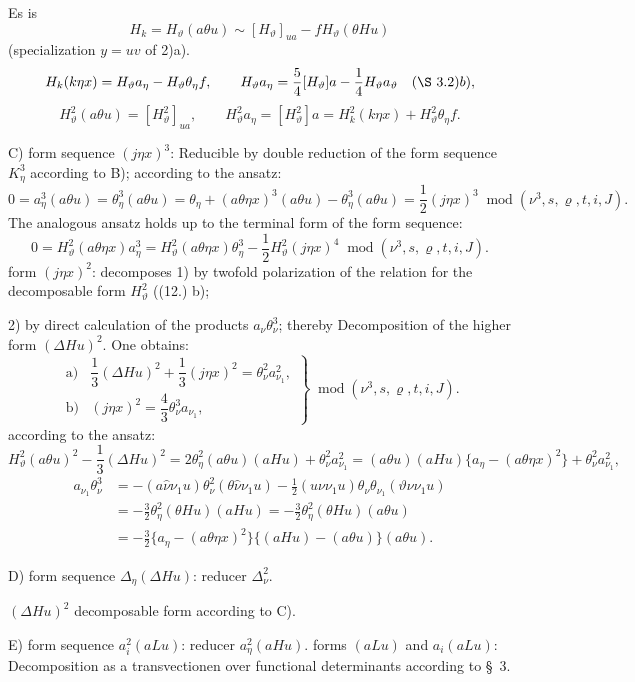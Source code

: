 \documentclass[11pt]{article}
\newcommand{\A}{\Delta}
\newcommand{\R}{\varrho}
\newcommand{\modu}[1]{\;\operatorname{mod} #1}
\providecommand{\modu}[1]{\;\operatorname{mod} #1}
\begin{document}
Es is
\[
H_k=H_\vartheta(a\theta u)\sim [H_\vartheta]_{ua}-fH_\vartheta(\theta Hu)
\]
(specialization $y=uv$ of 2)a).
\[
H_k(k\eta x)=H_\vartheta a_\eta-H_\vartheta\theta_\eta f,
\qquad
H_\vartheta a_\eta=\frac54[H_\vartheta]a-\frac14H_\vartheta a_\vartheta
\quad(\S\ 3. 2)b),
\]
\[
H_\vartheta^2(a\theta u)=[H_\vartheta^2]_{ua},
\qquad
H_\vartheta^2a_\eta=[H_\vartheta^2]a=H_k^2(k\eta x)+H_\vartheta^2\theta_\eta f.
\]

\noindent C) form sequence $(j\eta x)^3$: Reducible by double reduction of the form sequence $K_\eta^3$ according to B); according to the ansatz:
\[
0=a_\eta^3(a\theta u)=\theta_\eta^3(a\theta u)
=\theta_\eta+(a\theta\eta x)^3(a\theta u)-\theta_\eta^3(a\theta u)
=\frac12(j\eta x)^3\modu{(\nu^3,s,\R,t,i,J)}.
\]
The analogous ansatz holds up to the terminal form of the form sequence:
\[
0=H_\vartheta^2(a\theta\eta x)a_\eta^3
=H_\vartheta^2(a\theta\eta x)\theta_\eta^3
-\frac12H_\vartheta^2(j\eta x)^4\modu{(\nu^3,s,\R,t,i,J)}.
\]
form $(j\eta x)^2$: decomposes 1) by twofold polarization of the relation for the decomposable form $H_\vartheta^2$ ((12.) b);

2) by direct calculation of the products $a_\nu\theta_\nu^3$; thereby Decomposition of the higher form $(\A Hu)^2$. One obtains:
\[
\tag{18}
\left.\begin{array}{ll}
\text{a)}&\dfrac13(\A Hu)^2+\dfrac13(j\eta x)^2=\theta_\nu^2a_{\nu_1}^2,\\[0.6em]
\text{b)}&(j\eta x)^2=\dfrac43\theta_\nu^3a_{\nu_1},
\end{array}\right\}\modu{(\nu^3,s,\R,t,i,J)}.
\]
according to the ansatz:
\[
H_\vartheta^2(a\theta u)^2-\frac13(\A Hu)^2
=2\theta_\eta^2(a\theta u)(aHu)+\theta_\nu^2a_{\nu_1}^2
=(a\theta u)(aHu)\{a_\eta-(a\theta\eta x)^2\}+\theta_\nu^2a_{\nu_1}^2,
\]
\[
\begin{aligned}
a_{\nu_1}\theta_\nu^3
&=-(a\widehat{\nu}\nu_1u)\theta_\nu^2(\theta\widehat{\nu}\nu_1u)
-\frac12(u\nu\nu_1u)\theta_\nu\theta_{\nu_1}(\vartheta\nu\nu_1u)\\
&=-\frac32\theta_\eta^2(\theta Hu)(aHu)
=-\frac32\theta_\eta^2(\theta Hu)(a\theta u)\\
&=-\frac32\{a_\eta-(a\theta\eta x)^2\}\{(aHu)-(a\theta u)\}(a\theta u).
\end{aligned}
\]

\noindent D) form sequence $\A_\eta(\A Hu)$: reducer $\A_\nu^2$.

$(\A Hu)^2$ decomposable form according to C).

\noindent E) form sequence $a_i^2(aLu)$: reducer $a_\eta^2(aHu)$. forms $(aLu)$ and $a_i(aLu)$: Decomposition as a transvectionen over functional determinants according to \S\ 3.
\end{document}
